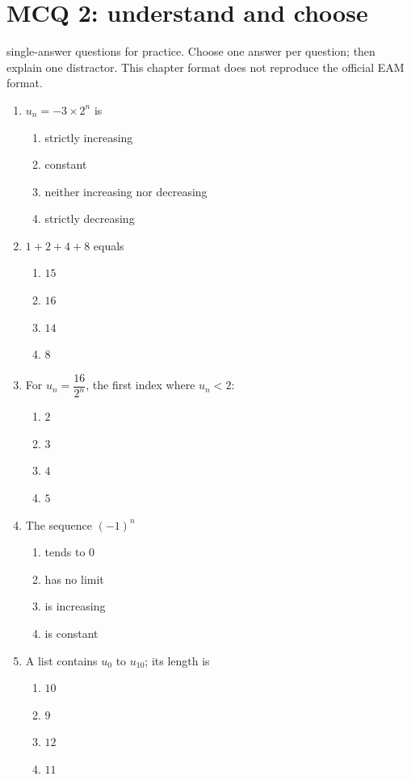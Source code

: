 \endgroup
\begingroup\small
{}\section*{MCQ 2: understand and choose}\label{C01-Q2}
 single-answer questions for practice. Choose one answer per question; then explain one distractor. This chapter format does not reproduce the official EAM format.
\begin{enumerate}
\item $u_n=-3\times2^n$ is
\begin{enumerate}[label=\Alph*.,itemsep=2pt]
\item strictly increasing
\item constant
\item neither increasing nor decreasing
\item strictly decreasing
\end{enumerate}
\item $1+2+4+8$ equals
\begin{enumerate}[label=\Alph*.,itemsep=2pt]
\item $15$
\item $16$
\item $14$
\item $8$
\end{enumerate}
\item For $u_n=\dfrac{16}{2^n}$, the first index where $u_n<2$:
\begin{enumerate}[label=\Alph*.,itemsep=2pt]
\item $2$
\item $3$
\item $4$
\item $5$
\end{enumerate}
\item The sequence $(-1)^n$
\begin{enumerate}[label=\Alph*.,itemsep=2pt]
\item tends to 0
\item has no limit
\item is increasing
\item is constant
\end{enumerate}
\item A list contains $u_0$ to $u_{10}$; its length is
\begin{enumerate}[label=\Alph*.,itemsep=2pt]
\item $10$
\item $9$
\item $12$
\item $11$
\end{enumerate}
\end{enumerate}
